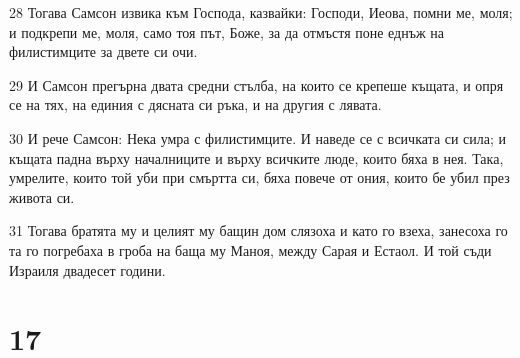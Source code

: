 \par 28 Тогава Самсон извика към Господа, казвайки: Господи, Иеова, помни ме, моля; и подкрепи ме, моля, само тоя път, Боже, за да отмъстя поне еднъж на филистимците за двете си очи.
\par 29 И Самсон прегърна двата средни стълба, на които се крепеше къщата, и опря се на тях, на единия с дясната си ръка, и на другия с лявата.
\par 30 И рече Самсон: Нека умра с филистимците. И наведе се с всичката си сила; и къщата падна върху началниците и върху всичките люде, които бяха в нея. Така, умрелите, които той уби при смъртта си, бяха повече от ония, които бе убил през живота си.
\par 31 Тогава братята му и целият му бащин дом слязоха и като го взеха, занесоха го та го погребаха в гроба на баща му Маноя, между Сарая и Естаол. И той съди Израиля двадесет години.

\chapter{17}

